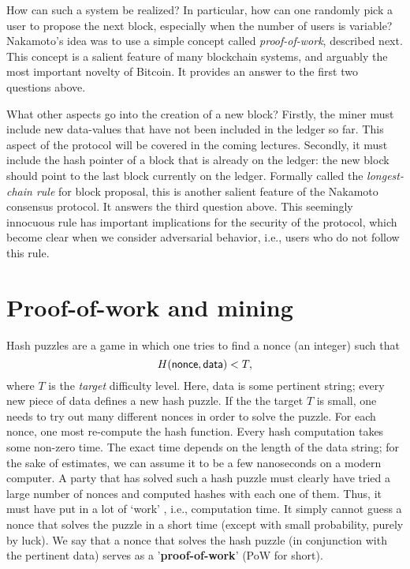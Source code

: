 \documentclass{article}
\begin{document}
How can such a system be realized? In particular, how can one randomly pick a user to propose the next block, especially when the number of users is variable? Nakamoto's idea was to use a simple concept called \textit{proof-of-work}, described next. This concept is a salient feature of many blockchain systems, and arguably the most important novelty of Bitcoin. It provides an answer to the first two questions above. 

What other aspects go into the creation of a new block? Firstly, the miner must include new data-values that have not been included in the ledger so far. This aspect of the protocol will be covered in the coming lectures. Secondly, it must include the hash pointer of a block that is already on the ledger:   the new block should point to the last block currently on the ledger. Formally called the \textit{longest-chain rule} for block proposal, this is another salient feature of the Nakamoto consensus protocol. It answers the third question above. This seemingly innocuous rule has important implications for the security of the protocol, which become clear when we consider adversarial behavior, i.e., users who do not follow this rule.

\section*{Proof-of-work and mining}
Hash puzzles are a game in which one tries to find a {\sf nonce} (an integer) such that 
$$
H({\sf nonce}, {\sf data}) <  T, 
$$
where $T$ is the {\em target  } difficulty level. 
Here, {\sf data} is some pertinent string; every new piece of data defines a new hash puzzle. If the the target $T$ is small, one needs to try out many different nonces in order to solve the puzzle. For each nonce, one most re-compute the hash function. Every hash computation takes some non-zero time. The exact time depends on the length of the data string; for the sake of estimates, we can assume it to be a few nanoseconds on a modern computer. A party that has solved such a hash puzzle must clearly have tried a large number of nonces and computed hashes with each one of them. Thus, it must have put in a lot of `work' , i.e., computation time. It simply cannot guess a nonce that solves the puzzle in a short time (except with small probability, purely by luck). We say that a nonce that solves the hash puzzle (in conjunction with the pertinent data) serves as a '\textbf{proof-of-work}' (PoW for short). 

\end{document}
